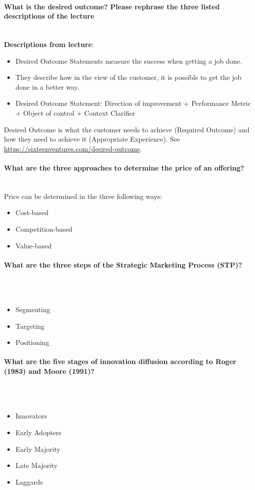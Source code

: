 \documentclass[10pt,a4paper,noendnumber=true]{scrartcl}
\newcommand{\properparagraph}[1]{\paragraph{\textcolor{Emerald}{#1}}\mbox{}\\}
\begin{document}
\properparagraph{What is the desired outcome? Please rephrase the three listed descriptions of the lecture}
\textbf{Descriptions from lecture}:
\begin{itemize}
	\item Desired Outcome Statements measure the success when getting a job done.
	\item They describe how in the view of the customer, it is possible to get the job done in a better way. 
	\item Desired Outcome Statement: Direction of improvement + Performance Metric + Object of control + Context Clarifier
\end{itemize}
 
Desired Outcome is what the customer needs to achieve (Required Outcome) and how they need to achieve it (Appropriate Experience). See \href{https://sixteenventures.com/desired-outcome}{https://sixteenventures.com/desired-outcome}.

\properparagraph{What are the three approaches to determine the price of an offering?}
Price can be determined in the three following ways:
\begin{itemize}
	\item Cost-based
	\item Competition-based
	\item Value-based
\end{itemize}

\properparagraph{What are the three steps of the Strategic Marketing Process (STP)?}
\\[-6ex]
\begin{itemize}
	\item Segmenting
	\item Targeting
	\item Positioning
\end{itemize}

\properparagraph{What are the five stages of innovation diffusion according to Roger (1983) and Moore (1991)?}
\\[-6ex]
\begin{itemize}
	\item Innovators
	\item Early Adopters
	\item Early Majority
	\item Late Majority
	\item Laggards
\end{itemize}
\end{document}
